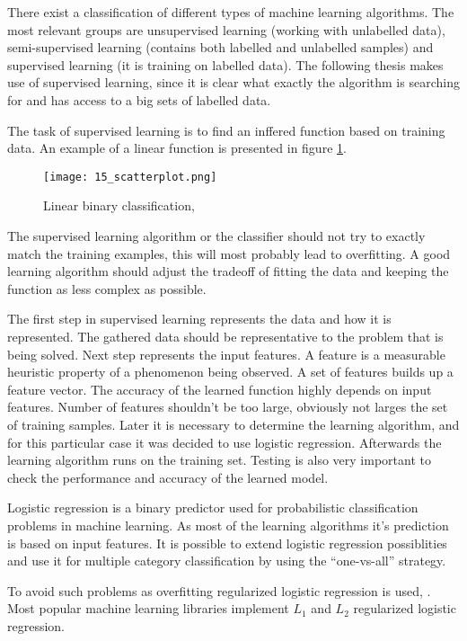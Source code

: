 There exist a classification of different types of machine learning algorithms. The most relevant groups are unsupervised learning (working with unlabelled data), semi-supervised learning (contains both labelled and unlabelled samples) and supervised learning (it is training on labelled data). The following thesis makes use of supervised learning, since it is clear what exactly the algorithm is searching for and has access to a big sets of labelled data.

The task of supervised learning is to find an inffered function based on training data. An example of a linear function is presented in figure \ref{fig:scatterplot}. 

\begin{figure}[!ht]
\centering
  \texttt{[image: 15\_scatterplot.png]}
\caption{Linear binary classification, \cite{scatterplot}}
\label{fig:scatterplot}
\end{figure}

The supervised learning algorithm or the classifier should not try to exactly match the training examples, this will most probably lead to overfitting. A good learning algorithm should adjust the tradeoff of fitting the data and keeping the function as less complex as possible.

The first step in supervised learning represents the data and how it is represented. The gathered data should be representative to the problem that is being solved. Next step represents the input features. A feature is a measurable heuristic property of a phenomenon being observed. A set of features builds up a feature vector. The accuracy of the learned function highly depends on input features. Number of features shouldn't be too large, obviously not larges the set of training samples. Later it is necessary to determine the learning algorithm, and for this particular case it was decided to use logistic regression. Afterwards the learning algorithm runs on the training set. Testing is also very important to check the performance and accuracy of the learned model. 

Logistic regression is a binary predictor used for probabilistic classification problems in machine learning. As most of the learning algorithms it's prediction is based on input features. It is possible to extend logistic regression possiblities and use it for multiple category classification by using the ``one-vs-all'' strategy.

To avoid such problems as overfitting regularized logistic regression is used, \cite{l1lg}. Most popular machine learning libraries implement $L_1$ and $L_2$ regularized logistic regression.

